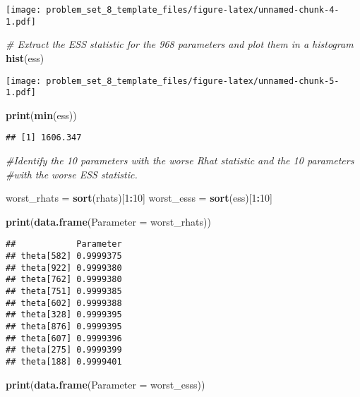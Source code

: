 \documentclass[
]{article}
\newenvironment{Shaded}{\begin{snugshade}}{\end{snugshade}}
\newcommand{\AttributeTok}[1]{\textcolor[rgb]{0.13,0.29,0.53}{#1}}
\newcommand{\CommentTok}[1]{\textcolor[rgb]{0.56,0.35,0.01}{\textit{#1}}}
\newcommand{\DecValTok}[1]{\textcolor[rgb]{0.00,0.00,0.81}{#1}}
\newcommand{\FunctionTok}[1]{\textcolor[rgb]{0.13,0.29,0.53}{\textbf{#1}}}
\newcommand{\NormalTok}[1]{#1}
\newcommand{\OtherTok}[1]{\textcolor[rgb]{0.56,0.35,0.01}{#1}}
\newcommand{\SpecialCharTok}[1]{\textcolor[rgb]{0.81,0.36,0.00}{\textbf{#1}}}
\begin{document}
\texttt{[image: problem\_set\_8\_template\_files/figure-latex/unnamed-chunk-4-1.pdf]}

\begin{Shaded}
\begin{Highlighting}[]
\CommentTok{\# Extract the ESS statistic for the 968 parameters and plot them in a histogram}
\FunctionTok{hist}\NormalTok{(ess)}
\end{Highlighting}
\end{Shaded}

\texttt{[image: problem\_set\_8\_template\_files/figure-latex/unnamed-chunk-5-1.pdf]}

\begin{Shaded}
\begin{Highlighting}[]
\FunctionTok{print}\NormalTok{(}\FunctionTok{min}\NormalTok{(ess))}
\end{Highlighting}
\end{Shaded}

\begin{verbatim}
## [1] 1606.347
\end{verbatim}

\begin{Shaded}
\begin{Highlighting}[]
\CommentTok{\#Identify the 10 parameters with the worse Rhat statistic and the 10 parameters}
\CommentTok{\#with the worse ESS statistic.}

\NormalTok{worst\_rhats }\OtherTok{=} \FunctionTok{sort}\NormalTok{(rhats)[}\DecValTok{1}\SpecialCharTok{:}\DecValTok{10}\NormalTok{]}
\NormalTok{worst\_esss }\OtherTok{=} \FunctionTok{sort}\NormalTok{(ess)[}\DecValTok{1}\SpecialCharTok{:}\DecValTok{10}\NormalTok{]}

\FunctionTok{print}\NormalTok{(}\FunctionTok{data.frame}\NormalTok{(}\AttributeTok{Parameter =}\NormalTok{ worst\_rhats))}
\end{Highlighting}
\end{Shaded}

\begin{verbatim}
##            Parameter
## theta[582] 0.9999375
## theta[922] 0.9999380
## theta[762] 0.9999380
## theta[751] 0.9999385
## theta[602] 0.9999388
## theta[328] 0.9999395
## theta[876] 0.9999395
## theta[607] 0.9999396
## theta[275] 0.9999399
## theta[188] 0.9999401
\end{verbatim}

\begin{Shaded}
\begin{Highlighting}[]
\FunctionTok{print}\NormalTok{(}\FunctionTok{data.frame}\NormalTok{(}\AttributeTok{Parameter =}\NormalTok{ worst\_esss))}
\end{Highlighting}
\end{Shaded}
\end{document}
